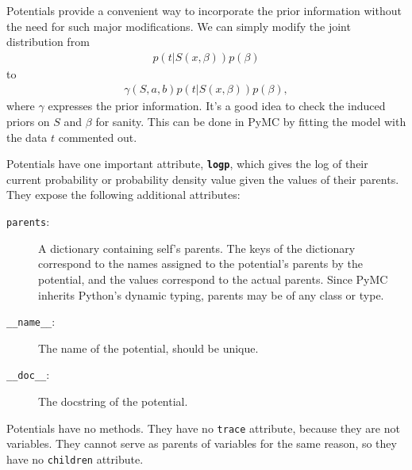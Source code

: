 Potentials provide a convenient way to incorporate the prior information without the need for such major modifications. We can simply modify the joint distribution from
\begin{eqnarray*}
    p(t|S(x,\beta)) p(\beta)
\end{eqnarray*}
to
\begin{eqnarray*}
    \gamma(S,a,b) p(t|S(x,\beta)) p(\beta),
\end{eqnarray*}
where $\gamma$ expresses the prior information. It's a good idea to check the induced priors on $S$ and $\beta$ for sanity. This can be done in PyMC by fitting the model with the data $t$ commented out.

\bigskip
Potentials have one important attribute, \texttt{\bfseries logp}, which gives the log of their current probability or probability density value given the values of their parents. They expose the following additional attributes:
\begin{description}
    \item[\texttt{parents}:] A dictionary containing self's parents. The keys of the dictionary correspond to the names assigned to the potential's parents by the potential, and the values correspond to the actual parents. Since PyMC inherits Python's dynamic typing, parents may be of any class or type.
    \item[\texttt{\_\_name\_\_}:] The name of the potential, should be unique.
    \item[\texttt{\_\_doc\_\_}:] The docstring of the potential.
\end{description}
Potentials have no methods. They have no \texttt{trace} attribute, because they are not variables. They cannot serve as parents of variables for the same reason, so they have no \texttt{children} attribute.


